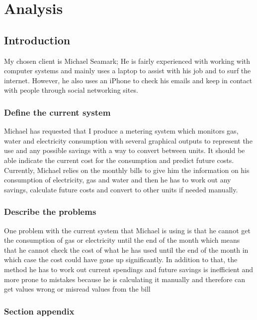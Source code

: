 \chapter{Analysis}

\section{Introduction}
My chosen client is Michael Seamark; He is fairly experienced with working with computer systems and mainly uses a laptop to assist with his job and to surf the internet. However, he also uses an iPhone to check his emails and keep in contact with people through social networking sites.

\subsection{Define the current system}
Michael has requested that I produce a metering system which monitors gas, water and electricity consumption with several graphical outputs to represent the use and any possible savings with a way to convert between units. It should be able indicate the current cost for the consumption and predict future costs. Currently, Michael relies on the monthly bills to give him the information on his consumption of electricity, gas and water and then he has to work out any savings, calculate future costs and convert to other units if needed manually.

\subsection{Describe the problems}
One problem with the current system that Michael is using is that he cannot get the consumption of gas or electricity until the end of the month which means that he cannot check the cost of what he has used until the end of the month in which case the cost could have gone up significantly. In addition to that, the method he has to work out current spendings and future savings is inefficient and more prone to mistakes because he is calculating it manually and therefore can get values wrong or misread values from the bill 

\subsection{Section appendix}
